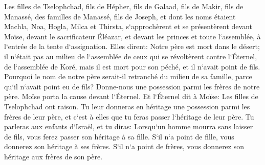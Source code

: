 \verse Les filles de Tselophchad, fils de Hépher, fils de Galaad, fils de Makir, fils de Manassé, des familles de Manassé, fils de Joseph, et dont les noms étaient Machla, Noa, Hogla, Milca et Thirsta, 
\verse s`approchèrent et se présentèrent devant Moïse, devant le sacrificateur Éléazar, et devant les princes et toute l`assemblée, à l`entrée de la tente d`assignation. Elles dirent: 
\verse Notre père est mort dans le désert; il n`était pas au milieu de l`assemblée de ceux qui se révoltèrent contre l`Éternel, de l`assemblée de Koré, mais il est mort pour son péché, et il n`avait point de fils. 
\verse Pourquoi le nom de notre père serait-il retranché du milieu de sa famille, parce qu`il n`avait point eu de fils? Donne-nous une possession parmi les frères de notre père. 
\verse Moïse porta la cause devant l`Éternel. 
\verse Et l`Éternel dit à Moïse: 
\verse Les filles de Tselophchad ont raison. Tu leur donneras en héritage une possession parmi les frères de leur père, et c`est à elles que tu feras passer l`héritage de leur père. 
\verse Tu parleras aux enfants d`Israël, et tu diras: Lorsqu`un homme mourra sans laisser de fils, vous ferez passer son héritage à sa fille. 
\verse S`il n`a point de fille, vous donnerez son héritage à ses frères. 
\verse S`il n`a point de frères, vous donnerez son héritage aux frères de son père. 
